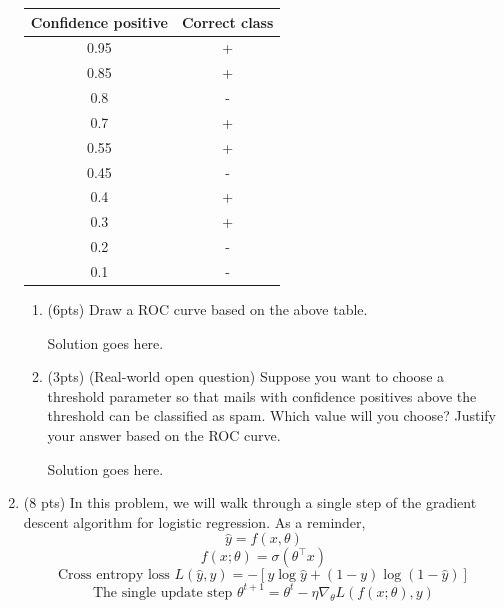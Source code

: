 \documentclass[a4paper]{article}
\theoremstyle{definition}
\newenvironment{soln}{
    \leavevmode\color{blue}\ignorespaces
}{}
\begin{document}
\begin{enumerate}
	      \begin{center}
		      \begin{tabular}{ c  c }
			      \hline
			      Confidence positive & Correct class \\ \hline
			      0.95                & +             \\
			      0.85                & +             \\
			      0.8                 & -             \\
			      0.7                 & +             \\
			      0.55                & +             \\
			      0.45                & -             \\
			      0.4                 & +             \\
			      0.3                 & +             \\
			      0.2                 & -             \\
			      0.1                 & -             \\
			      \hline
		      \end{tabular}
	      \end{center}

	      \begin{enumerate}
		      \item (6pts) Draw a ROC curve based on the above table.

		            \begin{soln}  Solution goes here. \end{soln}

		      \item (3pts) (Real-world open question) Suppose you want to choose a threshold parameter so that mails with confidence positives above the threshold can be classified as spam. Which value will you choose? Justify your answer based on the ROC curve.

		            \begin{soln}  Solution goes here. \end{soln}
	      \end{enumerate}

	\item (8 pts) In this problem, we will walk through a single step of the gradient descent algorithm for logistic regression. As a reminder,
	      $$\hat{y} = f(x, \theta)$$
	      $$f(x;\theta) = \sigma(\theta^\top x)$$
	      $$\text{Cross entropy loss } L(\hat{y}, y) = -[y \log  \hat{y} + (1-y)\log(1-\hat{y})]$$
	      $$\text{The single update step } \theta^{t+1} = \theta^{t} - \eta \nabla_{\theta} L(f(x;\theta), y) $$




\end{enumerate}
\end{document}
